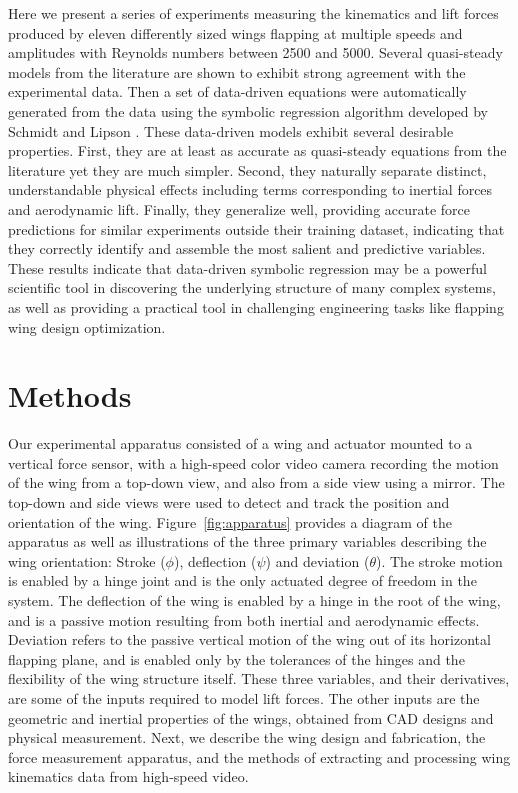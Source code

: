 \documentclass{article}
\begin{document}
Here we present a series of experiments measuring the kinematics and lift forces
produced by eleven differently sized wings flapping at multiple speeds and
amplitudes with Reynolds numbers between 2500 and 5000. Several quasi-steady
models from the literature are shown to exhibit strong agreement with the
experimental data. Then a set of data-driven equations were automatically
generated from the data using the symbolic regression algorithm developed by
Schmidt and Lipson \cite{schmidt2009distilling}. These data-driven models
exhibit several desirable properties. First, they are at least as accurate as
quasi-steady equations from the literature yet they are much simpler.  Second,
they naturally separate distinct, understandable physical effects including
terms corresponding to inertial forces and aerodynamic lift. Finally, they
generalize well, providing accurate force predictions for similar experiments
outside their training dataset, indicating that they correctly identify and
assemble the most salient and predictive variables. These results indicate that
data-driven symbolic regression may be a powerful scientific tool in discovering
the underlying structure of many complex systems, as well as providing a
practical tool in challenging engineering tasks like flapping wing design
optimization.

\section*{Methods}
Our experimental apparatus consisted of a wing and actuator mounted to a
vertical force sensor, with a high-speed color video camera recording the motion
of the wing from a top-down view, and also from a side view using a mirror. The
top-down and side views were used to detect and track the position and
orientation of the wing.  Figure~\ref{fig:apparatus} provides a diagram of the
apparatus as well as illustrations of the three primary variables describing the
wing orientation: Stroke ($\phi$), deflection ($\psi$) and deviation ($\theta$).
The stroke motion is enabled by a hinge joint and is the only actuated degree of
freedom in the system. The deflection of the wing is enabled by a hinge in the
root of the wing, and is a passive motion resulting from both inertial and
aerodynamic effects. Deviation refers to the passive vertical motion of the wing
out of its horizontal flapping plane, and is enabled only by the tolerances of
the hinges and the flexibility of the wing structure itself. These three
variables, and their derivatives, are some of the inputs required to model lift
forces. The other inputs are the geometric and inertial properties of the wings,
obtained from CAD designs and physical measurement. Next, we describe the wing
design and fabrication, the force measurement apparatus, and the methods of
extracting and processing wing kinematics data from high-speed video.
\end{document}
